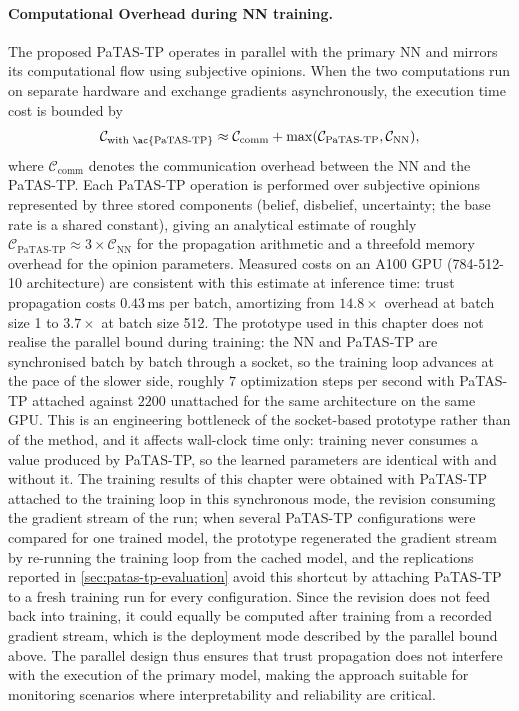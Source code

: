 \paragraph*{Computational Overhead during \ac{NN} training.}
The proposed \ac{PaTAS-TP} operates in parallel with the primary \ac{NN} and mirrors its computational flow using subjective opinions. When the two computations run on separate hardware and exchange gradients asynchronously, the execution time cost is bounded by
\[
\mathcal{C}_{\text{with \ac{PaTAS-TP}}} \approx \mathcal{C}_{\text{comm}} + \max(\mathcal{C}_{\text{PaTAS-TP}}, \mathcal{C}_{\text{NN}}),
\]
where \(\mathcal{C}_{\text{comm}}\) denotes the communication overhead between the \ac{NN} and the \ac{PaTAS-TP}. Each \ac{PaTAS-TP} operation is performed over subjective opinions represented by three stored components (belief, disbelief, uncertainty; the base rate is a shared constant), giving an analytical estimate of roughly \(\mathcal{C}_{\text{PaTAS-TP}} \approx 3 \times \mathcal{C}_{\text{NN}}\) for the propagation arithmetic and a threefold memory overhead for the opinion parameters. Measured costs on an A100 GPU (784-512-10 architecture) are consistent with this estimate at inference time: trust propagation costs $0.43$\,ms per batch, amortizing from $14.8\times$ overhead at batch size 1 to $3.7\times$ at batch size 512. The prototype used in this chapter does not realise the parallel bound during training: the \ac{NN} and \ac{PaTAS-TP} are synchronised batch by batch through a socket, so the training loop advances at the pace of the slower side, roughly $7$ optimization steps per second with \ac{PaTAS-TP} attached against $2200$ unattached for the same architecture on the same GPU. This is an engineering bottleneck of the socket-based prototype rather than of the method, and it affects wall-clock time only: training never consumes a value produced by \ac{PaTAS-TP}, so the learned parameters are identical with and without it. The training results of this chapter were obtained with \ac{PaTAS-TP} attached to the training loop in this synchronous mode, the revision consuming the gradient stream of the run; when several \ac{PaTAS-TP} configurations were compared for one trained model, the prototype regenerated the gradient stream by re-running the training loop from the cached model, and the replications reported in \cref{sec:patas-tp-evaluation} avoid this shortcut by attaching \ac{PaTAS-TP} to a fresh training run for every configuration. Since the revision does not feed back into training, it could equally be computed after training from a recorded gradient stream, which is the deployment mode described by the parallel bound above. The parallel design thus ensures that trust propagation does not interfere with the execution of the primary model, making the approach suitable for monitoring scenarios where interpretability and reliability are critical.



